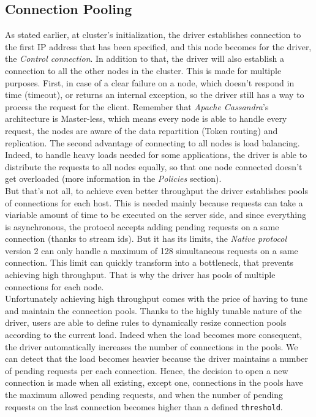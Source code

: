 \documentclass[a4paper]{report}
\newcommand{\ca}{\emph{Apache Cassandra\xspace}}
\begin{document}
\subsection{Connection Pooling}
As stated earlier, at cluster's initialization, the driver establishes connection to the first IP address that has been specified, and this node becomes for the driver, the \emph{Control connection}. In addition to that, the driver will also establish a connection to all the other nodes in the cluster. This is made for multiple purposes. First, in case of a clear failure on a node, which doesn't respond in time (timeout), or returns an internal exception, so the driver still has a way to process the request for the client. Remember that \ca{}'s architecture is Master-less, which means every node is able to handle every request, the nodes are aware of the data repartition (Token routing) and replication. The second advantage of connecting to all nodes is load balancing. Indeed, to handle heavy loads needed for some applications, the driver is able to distribute the requests to all nodes equally, so that one node connected doesn't get overloaded (more information in the \emph{Policies} section).\\
But that's not all, to achieve even better throughput the driver establishes pools of connections for each host. This is needed mainly because requests can take a viariable amount of time to be executed on the server side, and since everything is asynchronous, the protocol accepts adding pending requests on a same connection (thanks to stream ids). But it has its limits, the \emph{Native protocol} version 2 can only handle a maximum of 128 simultaneous requests on a same connection. This limit can quickly transform into a bottleneck, that prevents achieving high throughput. That is why the driver has pools of multiple connections for each node.\\
Unfortunately achieving high throughput comes with the price of having to tune and maintain the connection pools. Thanks to the highly tunable nature of the driver, users are able to define rules to dynamically resize connection pools according to the current load. Indeed when the load becomes more consequent, the driver automatically increases the number of connections in the pools. We can detect that the load becomes heavier because the driver maintains a number of pending requests per each connection. Hence, the decision to open a new connection is made when all existing, except one, connections in the pools have the maximum allowed pending requests, and when the number of pending requests on the last connection becomes higher than a defined \verb;threshold;.\\
\end{document}
